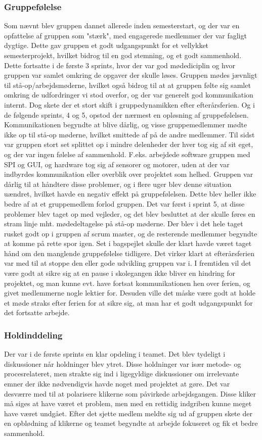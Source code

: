 \subsubsection{Gruppefølelse}
Som nævnt blev gruppen dannet allerede inden semesterstart, og der var en opfattelse af gruppen som "stærk", med engagerede medlemmer der var fagligt dygtige. Dette gav gruppen et godt udgangspunkt for et vellykket semesterprojekt, hvilket bidrog til en god stemning, og et godt sammenhold. Dette fortsatte i de første 3 sprints, hvor der var god mødediciplin og hvor gruppen var samlet omkring de opgaver der skulle løses. Gruppen mødes jævnligt til stå-op/arbejdsmøderne, hvilket også bidrog til at at gruppen følte sig samlet omkring de udfordringer vi stod overfor, og der var generelt god kommunikation internt. Dog skete der et 
stort skift i gruppedynamikken efter efterårsferien. Og i de følgende sprints, 4 og 5, opstod der nærmest en opløsning af gruppefølelsen. Kommunikationen begyndte at blive dårlig, og visse gruppemedlemmer mødte ikke op til stå-op møderne, hvilket smittede af på de andre medlemmer. Til sidst var gruppen stort set splittet op i mindre delenheder der hver tog sig af sit eget, og der var ingen følelse af sammenhold. F.eks. arbejdede software gruppen med SPI og GUI, og hardware tog sig af sensorer og motorer, uden at der var indbyrdes kommunikation eller overblik over projektet som helhed. Gruppen var dårlig til at håndtere disse problemer, og i flere uger blev denne situation uændret, hvilket havde en negativ effekt på gruppefølelsen. Dette blev heller ikke bedre af at et gruppemedlem forlod gruppen. Det var først i sprint 5, at disse problemer blev taget op med vejleder, og det blev besluttet at der skulle føres en stram linje mht. mødedeltagelse på stå-op møderne. Der blev i det hele taget rusket godt op i gruppen af scrum master, og de resterende medlemmer begyndte at komme på rette spor igen. Set i bagspejlet skulle der klart havde været taget hånd om den manglende gruppefølelse tidligere. Det virker klart at efterårsferien var med til at stoppe den eller gode udvikling gruppen var i. I fremtiden vil det være godt at sikre sig at en pause i skolegangen ikke bliver en hindring for projektet, og man kunne evt. have fortsat kommunikationen hen over ferien, og givet medlemmerne nogle lektier for. Desuden ville det måske være godt at holde et møde straks efter ferien for at sikre sig, at man har et godt udgangspunkt for det fortsatte arbejde.  

\subsubsection{Holdinddeling}
Der var i de første sprints en klar opdeling i teamet. Det blev tydeligt i diskussioner når holdninger blev ytret. Disse holdninger var især metode- og procesrelateret, men strakte sig ind i ligegyldige diskussioner om irrelevante emner der ikke nødvendigvis havde noget med projektet at gøre. Det var desværre med til at polarisere klikerne som påvirkede arbejdsgangen. Disse kliker må siges at have været et problem, men med en rettidig indgriben kunne meget have været undgået. Efter det sjette medlem meldte sig ud af gruppen skete der en opblødning af klikerne og teamet begyndte at arbejde fokuseret og fik et bedre sammenhold.

